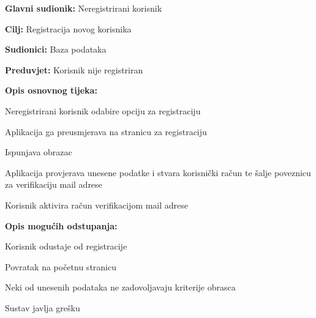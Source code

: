 				
				
					\noindent {}
				\begin{packed_item}
					
					\item \textbf{Glavni sudionik: }Neregistrirani korisnik
					\item  \textbf{Cilj:} Registracija novog korisnika
					\item  \textbf{Sudionici:} Baza podataka
					\item  \textbf{Preduvjet:} Korisnik nije registriran
					\item  \textbf{Opis osnovnog tijeka:}
					
					\item[] \begin{packed_enum}
						
						\item Neregistrirani korisnik odabire opciju za registraciju
						\item Aplikacija ga preusmjerava na stranicu za registraciju
						\item Ispunjava obrazac
						\item Aplikacija provjerava unesene podatke i stvara korisnički račun te šalje poveznicu za verifikaciju mail adrese
						\item Korisnik aktivira račun verifikacijom mail adrese
					\end{packed_enum}
					
					\item  \textbf{Opis mogućih odstupanja:}
					
					\item[] \begin{packed_item}
						
						\item[3.a] Korisnik odustaje od registracije
						\item[] \begin{packed_enum}
							
							\item Povratak na početnu stranicu
							
						\end{packed_enum}
						\item[4.a] Neki od unesenih podataka ne zadovoljavaju kriterije obrasca
						\item[] \begin{packed_enum}
							
							\item Sustav javlja grešku
							

\end{packed_enum}
\end{packed_item}
\end{packed_item}
